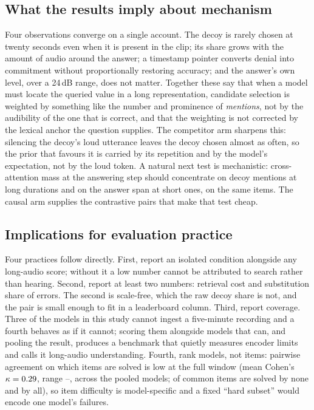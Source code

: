 \documentclass{article}
\begin{document}
\subsection{What the results imply about mechanism}
Four observations converge on a single account. The decoy is rarely chosen
at twenty seconds even when it is present in the clip; its share grows with
the amount of audio around the answer; a timestamp pointer converts denial
into commitment without proportionally restoring accuracy; and the answer's
own level, over a 24\,dB range, does not matter. Together these say that
when a model must locate the queried value in a long representation,
candidate selection is weighted by something like the number and prominence
of \emph{mentions}, not by the audibility of the one that is correct, and
that the weighting is not corrected by the lexical anchor the question
supplies. The competitor arm sharpens this: silencing the decoy's loud
utterance leaves the decoy chosen almost as often, so the prior that favours
it is carried by its repetition and by the model's expectation, not by the
loud token. A natural next test is mechanistic: cross-attention mass at the
answering step should concentrate on decoy mentions at long durations and on
the answer span at short ones, on the same items. The causal arm supplies
the contrastive pairs that make that test cheap.

\subsection{Implications for evaluation practice}
Four practices follow directly. First, report an isolated condition
alongside any long-audio score; without it a low number cannot be attributed
to search rather than hearing. Second, report at least two numbers:
retrieval cost and substitution share of errors. The second is scale-free,
which the raw decoy share is not, and the pair is small enough to fit in a
leaderboard column. Third, report coverage. Three of the models in this
study cannot ingest a five-minute recording and a fourth behaves as if it
cannot; scoring them alongside models that can, and pooling the result,
produces a benchmark that quietly measures encoder limits and calls it
long-audio understanding. Fourth, rank models, not items: pairwise agreement
on which items are solved is low at the full window (mean Cohen's
$\kappa=0.29{}$, range \kappaMin{}--\kappaMax{}, across the pooled
models; \itemsNoneLThree{} of \itemsCommon{} common items are solved by
none and \itemsAllLThree{} by all), so item difficulty is model-specific
and a fixed ``hard subset'' would encode one model's failures.
\end{document}
